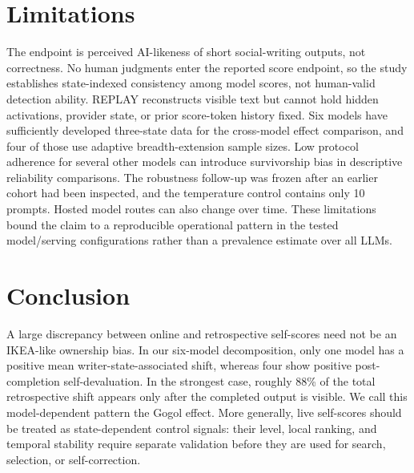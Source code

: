 \section{Limitations}
The endpoint is perceived AI-likeness of short social-writing outputs, not correctness. No human judgments enter the reported score endpoint, so the study establishes state-indexed consistency among model scores, not human-valid detection ability. REPLAY reconstructs visible text but cannot hold hidden activations, provider state, or prior score-token history fixed. Six models have sufficiently developed three-state data for the cross-model effect comparison, and four of those use adaptive breadth-extension sample sizes. Low protocol adherence for several other models can introduce survivorship bias in descriptive reliability comparisons. The robustness follow-up was frozen after an earlier cohort had been inspected, and the temperature control contains only 10 prompts. Hosted model routes can also change over time. These limitations bound the claim to a reproducible operational pattern in the tested model/serving configurations rather than a prevalence estimate over all LLMs.

\section{Conclusion}
A large discrepancy between online and retrospective self-scores need not be an IKEA-like ownership bias. In our six-model decomposition, only one model has a positive mean writer-state-associated shift, whereas four show positive post-completion self-devaluation. In the strongest case, roughly 88\% of the total retrospective shift appears only after the completed output is visible. We call this model-dependent pattern the Gogol effect. More generally, live self-scores should be treated as state-dependent control signals: their level, local ranking, and temporal stability require separate validation before they are used for search, selection, or self-correction.
